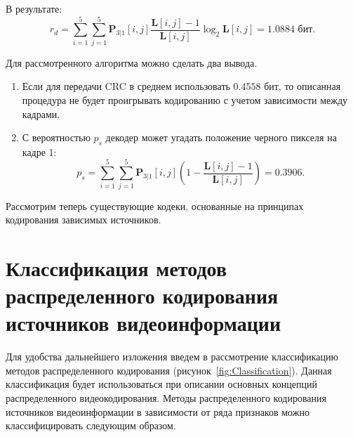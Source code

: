 \begin{enumerate}
В результате:
\begin{equation*}
r_d = \sum\limits_{i=1}^{5}\sum\limits_{j=1}^{5}\mathbf{P}_{3 \vert 1}[i,j]\frac{\mathbf{L}[i,j]-1}{\mathbf{L}[i,j]}\log_2 \mathbf{L}[i,j] = 1.0884\text{ бит}.
\end{equation*}

Для рассмотренного алгоритма можно сделать два вывода.
\begin{enumerate}
\item Если для передачи CRC в среднем использовать $0.4558$ бит, то описанная процедура не будет проигрывать кодированию с учетом зависимости между кадрами.
\item С вероятностью $p_s$ декодер может угадать положение черного пикселя на кадре 1:
\begin{equation*}
p_s = \sum\limits_{i=1}^{5}\sum\limits_{j=1}^{5} \mathbf{P}_{3 \vert 1}[i,j]\left(1-\frac{\mathbf{L}[i,j]-1}{\mathbf{L}[i,j]}\right) = 0.3906.
\end{equation*}

\end{enumerate}

\end{enumerate}

Рассмотрим теперь существующие кодеки, основанные на принципах кодирования зависимых источников.

\section{Классификация методов распределенного кодирования источников видеоинформации}
\label{chap:DVC:Classification}

Для удобства дальнейшего изложения введем в рассмотрение классификацию методов распределенного кодирования (рисунок~\ref{fig:Classification}). Данная классификация будет использоваться при описании основных концепций распределенного видеокодирования. Методы распределенного кодирования источников видеоинформации в зависимости от ряда признаков можно классифицировать следующим образом.

